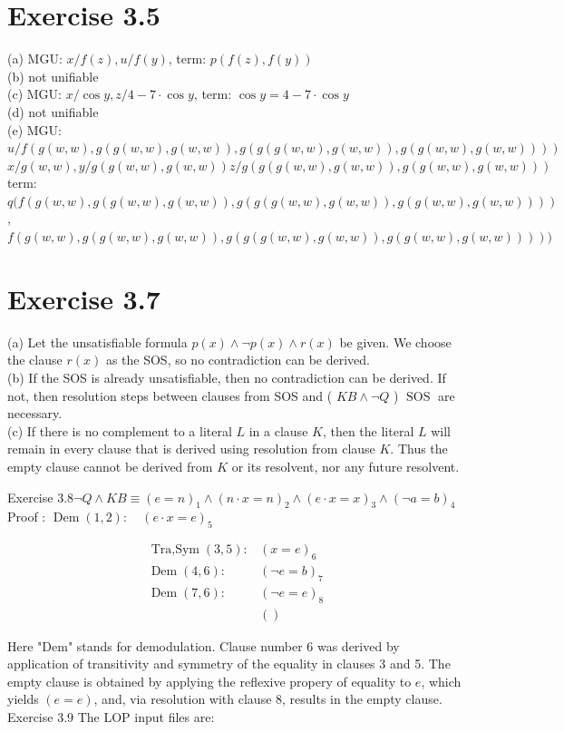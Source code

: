 \documentclass[10pt]{article}
\begin{document}
\section*{Exercise 3.5}
(a) MGU: $x / f(z), u / f(y)$, term: $p(f(z), f(y))$\\
(b) not unifiable\\
(c) MGU: $x / \cos y, z / 4-7 \cdot \cos y$, term: $\cos y=4-7 \cdot \cos y$\\
(d) not unifiable\\
(e) MGU: $u / f(g(w, w), g(g(w, w), g(w, w)), g(g(g(w, w), g(w, w)), g(g(w, w), g(w, w))))$ $x / g(w, w), y / g(g(w, w), g(w, w)) z / g(g(g(w, w), g(w, w)), g(g(w, w), g(w, w)))$ term: $q(f(g(w, w), g(g(w, w), g(w, w)), g(g(g(w, w), g(w, w)), g(g(w, w), g(w, w))))$, $f(g(w, w), g(g(w, w), g(w, w)), g(g(g(w, w), g(w, w)), g(g(w, w), g(w, w)))))$

\section*{Exercise 3.7}
(a) Let the unsatisfiable formula $p(x) \wedge \neg p(x) \wedge r(x)$ be given. We choose the clause $r(x)$ as the SOS, so no contradiction can be derived.\\
(b) If the SOS is already unsatisfiable, then no contradiction can be derived. If not, then resolution steps between clauses from SOS and ( $K B \wedge \neg Q$ ) $\operatorname{SOS}$ are necessary.\\
(c) If there is no complement to a literal $L$ in a clause $K$, then the literal $L$ will remain in every clause that is derived using resolution from clause $K$. Thus the empty clause cannot be derived from $K$ or its resolvent, nor any future resolvent.


Exercise $3.8 \neg Q \wedge K B \equiv(e=n)_{1} \wedge(n \cdot x=n)_{2} \wedge(e \cdot x=x)_{3} \wedge(\neg a=b)_{4}$\\
Proof : $\operatorname{Dem}(1,2): \quad(e \cdot x=e)_{5}$

$$
\begin{array}{ll}
\operatorname{Tra,Sym}(3,5): & (x=e)_{6} \\
\operatorname{Dem}(4,6): & (\neg e=b)_{7} \\
\operatorname{Dem}(7,6): & (\neg e=e)_{8} \\
& ()
\end{array}
$$

Here "Dem" stands for demodulation. Clause number 6 was derived by application of transitivity and symmetry of the equality in clauses 3 and 5. The empty clause is obtained by applying the reflexive propery of equality to $e$, which yields $(e=e)$, and, via resolution with clause 8, results in the empty clause.\\
Exercise 3.9 The LOP input files are:
\end{document}
